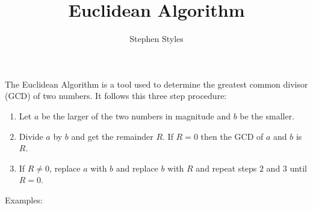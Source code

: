 \documentclass[16pt]{article}
\title{Euclidean Algorithm}
\author{Stephen Styles}
\theoremstyle{remark}
\begin{document}
\maketitle

The Euclidean Algorithm is a tool used to determine the greatest common divisor (GCD) of two numbers. It follows this three step procedure:
\begin{enumerate}
\item Let $a$ be the larger of the two numbers in magnitude and $b$ be the smaller.
\item Divide $a$ by $b$ and get the remainder $R$. If $R=0$ then the GCD of $a$ and $b$ is $R$.
\item If $R\not=0$, replace $a$ with $b$ and replace $b$ with $R$ and repeat steps $2$ and $3$ until $R=0$.
\end{enumerate} 
Examples:
\end{document}
